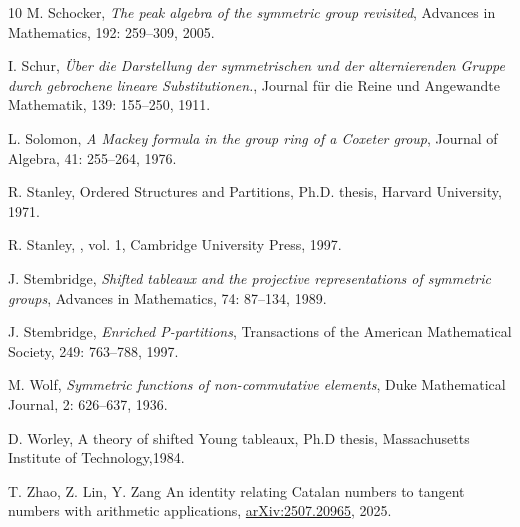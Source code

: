 \documentclass[11pt]{amsart}
\numberwithin{equation}{section}
\begin{document}
\begin{thebibliography}{10}
 M. Schocker,
\newblock \textit{The peak algebra of the symmetric group revisited},
\newblock Advances in Mathematics, 192: 259--309, 2005.

 I. Schur,
\newblock \textit{\"Uber die Darstellung der symmetrischen und der alternierenden Gruppe durch gebrochene lineare Substitutionen.},
\newblock  Journal f\"ur die Reine und Angewandte Mathematik, 139: 155--250, 1911.

 L. Solomon,
\newblock \textit{A Mackey formula in the group ring of a Coxeter group},
\newblock  Journal of Algebra, 41: 255--264, 1976.

 R. Stanley, Ordered Structures and Partitions, Ph.D. thesis, Harvard University, 1971.


 R. Stanley,
,
\newblock vol. 1, Cambridge University Press, 1997.

 J. Stembridge,
\newblock \textit{Shifted tableaux and the projective representations of symmetric groups},
\newblock Advances in Mathematics, 74: 87--134, 1989.

 J. Stembridge,
\newblock \textit{Enriched P-partitions},
\newblock Transactions of the American Mathematical Society, 249: 763--788, 1997.


 M. Wolf,
\newblock \textit{Symmetric functions of non-commutative elements},
\newblock Duke Mathematical Journal, 2: 626--637, 1936.

 D. Worley,
\newblock A theory of shifted Young tableaux,
\newblock Ph.D thesis, Massachusetts Institute of Technology,1984.

 T. Zhao, Z. Lin, Y. Zang
\newblock An identity relating Catalan numbers to tangent numbers with arithmetic applications,
\newblock  \href{https://arxiv.org/abs/2507.20965}{arXiv:2507.20965}, 2025.










\end{thebibliography}
\end{document}
